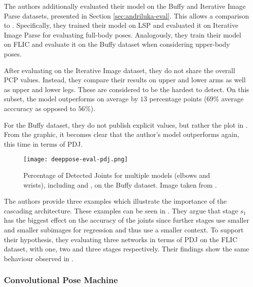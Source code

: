 The authors additionally evaluated their model on the Buffy and Iterative Image Parse datasets, presented in Section \ref{sec:andriluka-eval}.
This allows a comparison to \cite{yang_articulated_2013}.
Specifically, they trained their model on LSP and evaluated it on Iterative Image Parse for evaluating full-body poses.
Analogously, they train their model on FLIC and evaluate it on the Buffy dataset when considering upper-body poses.

After evaluating on the Iterative Image dataset, they do not share the overall PCP values.
Instead, they compare their results on upper and lower arms as well as upper and lower legs.
These are considered to be the hardest to detect.
On this subset, the model outperforms \cite{yang_articulated_2013} on average by $13$ percentage points ($69\%$ average acccuracy as opposed to $56\%$).

For the Buffy dataset, they do not publish explicit values, but rather the plot in .
From the graphic, it becomes clear that the author's model outperforms \cite{yang_articulated_2013} again, this time in terms of PDJ. 

\begin{figure}[htb!]
    \centering
    \texttt{[image: deeppose-eval-pdj.png]}
    \caption{Percentage of Detected Joints for multiple models (elbows and wrists), including \cite{toshev_deeppose:_2014} and \cite{yang_articulated_2013}, on the Buffy dataset. Image taken from \cite{toshev_deeppose:_2014}.}
    \label{fig:deeppose-eval}
\end{figure}

The authors provide three examples which illustrate the importance of the cascading architecture.
These examples can be seen in .
They argue that stage $s_1$ has the biggest effect on the accuracy of the joints since further stages use smaller and smaller subimages for regression and thus use a smaller context.
To support their hypothesis, they evaluating three networks in terms of PDJ on the FLIC dataset, with one, two and three stages respectively.
Their findings show the same behaviour observed in .

\subsubsection{Convolutional Pose Machine}
\label{sec:convolutional-pose-machine}
\cite{wei_convolutional_2016}

